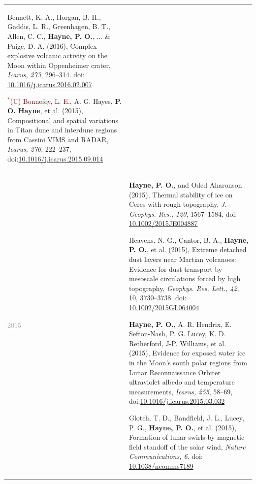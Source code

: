 \documentclass[letterpaper,10pt,twoside]{article}
\begin{document}
\begin{longtable}{@{} p{} p{}}
\begin{enumerate}[leftmargin=!,labelindent=2.5pt,itemindent=-10pt]
{            \item Bennett, K. A., Horgan, B. H., Gaddis, L. R., Greenhagen, B. T., Allen, C. C., {\bf Hayne, P. O.}, ... \& Paige, D. A. (2016), Complex explosive volcanic activity on the Moon within Oppenheimer crater, {\it Icarus, 273}, 296--314. doi: \href{https://doi.org/10.1016/j.icarus.2016.02.007}{10.1016/j.icarus.2016.02.007}
    
            \item \textcolor{darkred}{$^*$(U) Bonnefoy, L. E.}, A. G. Hayes, {\bf P. O. Hayne}, et al. (2015), Compositional and spatial variations in Titan dune and interdune regions from Cassini VIMS and RADAR, {\it Icarus, 270}, 222--237, doi:\href{https://doi.org/10.1016/j.icarus.2015.09.014}{10.1016/j.icarus.2015.09.014}
            }
            \end{enumerate} \\
            
    \textcolor{darkgray}{2015}    & \begin{enumerate} [leftmargin=!,labelindent=2.5pt,itemindent=-10pt]\setcounter{enumi}{87}
            {\small
            \item {\bf Hayne, P. O.}, and Oded Aharonson (2015), Thermal stability of ice on Ceres with rough topography, {\it J. Geophys. Res., 120}, 1567--1584, doi: \href{https://doi.org/10.1002/2015JE004887}{10.1002/2015JE004887}
    
            \item Heavens, N. G., Cantor, B. A., {\bf Hayne, P. O.}, et al. (2015), Extreme detached dust layers near Martian volcanoes: Evidence for dust transport by mesoscale circulations forced by high topography, {\it Geophys. Res. Lett., 42}, 10, 3730--3738. doi: \href{https://doi.org/10.1002/2015GL064004}{10.1002/2015GL064004}
    
            \item {\bf Hayne, P. O.}, A. R. Hendrix, E. Sefton-Nash, P. G. Lucey, K. D. Retherford, J-P. Williams, et al. (2015), Evidence for exposed water ice in the Moon's south polar regions from Lunar Reconnaissance Orbiter ultraviolet albedo and temperature measurements, {\it Icarus, 255}, 58--69, doi:\href{https://doi.org/10.1016/j.icarus.2015.03.032}{10.1016/j.icarus.2015.03.032}
    
            \item Glotch, T. D., Bandfield, J. L., Lucey, P. G., {\bf Hayne, P. O.}, et al. (2015), Formation of lunar swirls by magnetic field standoff of the solar wind, {\it Nature Communications, 6}. doi: \href{https://doi.org/10.1038/ncomms7189}{10.1038/ncomms7189}
    
}
\end{enumerate}
\end{longtable}
\end{document}
